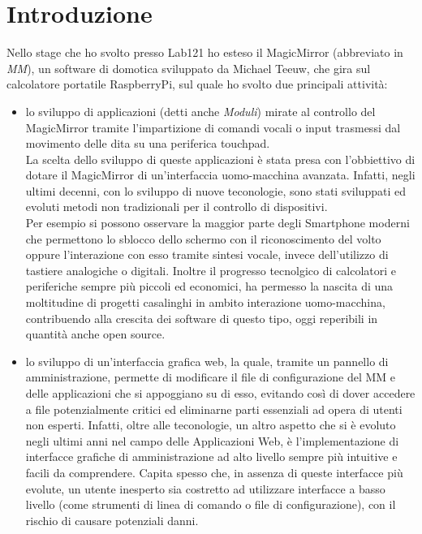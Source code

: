 \chapter*{Introduzione}

Nello stage che ho svolto presso Lab121 ho esteso il MagicMirror (abbreviato in \emph{MM}), un software di domotica sviluppato da Michael Teeuw,
che gira sul calcolatore portatile RaspberryPi\cite{Raspberry}, sul quale ho svolto due principali attivit\`a:\\
\begin{itemize}
\item lo sviluppo di applicazioni (detti anche \emph{Moduli}) mirate al controllo del
MagicMirror tramite l'impartizione di comandi vocali o input trasmessi dal movimento delle dita su
una periferica touchpad.\\
La scelta dello sviluppo di queste applicazioni \`e stata presa con l'obbiettivo di dotare il
MagicMirror di un'interfaccia uomo-macchina avanzata. Infatti, negli ultimi decenni, con lo sviluppo
di nuove teconologie, sono stati sviluppati ed evoluti metodi non tradizionali per il controllo di dispositivi.\\
Per esempio si possono osservare la maggior parte degli Smartphone moderni che permettono lo sblocco dello schermo con
il riconoscimento del volto oppure l'interazione con esso tramite sintesi vocale,
invece dell'utilizzo di tastiere analogiche o digitali.
Inoltre il progresso tecnolgico di calcolatori e periferiche sempre pi\`u piccoli ed economici, ha permesso
la nascita di una moltitudine di progetti casalinghi in ambito interazione uomo-macchina, contribuendo
alla crescita dei software di questo tipo, oggi reperibili in quantit\`a anche open source.\\[1\baselineskip]
\item lo sviluppo di un'interfaccia grafica web, la quale, tramite un pannello di amministrazione,
 permette di modificare il file di configurazione del MM e delle applicazioni che si appoggiano su di esso,
evitando cos\`i di dover accedere
a file potenzialmente critici ed eliminarne parti essenziali ad opera di utenti non esperti.
Infatti, oltre alle teconologie, un altro aspetto che si \`e evoluto negli ultimi anni
nel campo delle Applicazioni Web, \`e l'implementazione di interfacce grafiche di amministrazione
ad alto livello sempre pi\`u intuitive e facili da comprendere.
Capita spesso che, in assenza di queste interfacce pi\`u evolute, un utente inesperto sia
costretto ad utilizzare interfacce a basso livello (come strumenti di linea di comando o file
di configurazione), con il rischio di causare potenziali danni.\\[2\baselineskip]
\end{itemize}

